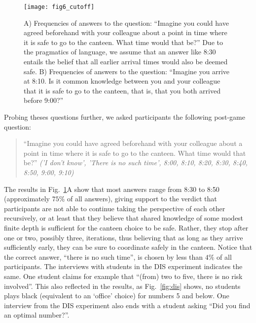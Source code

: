 \begin{figure} %
\centering\texttt{[image: fig6\_cutoff]}
\caption{A) Frequencies of answers to the question: ``Imagine you could have agreed beforehand with your colleague about a point in time where it is safe to go to the canteen. What time would that be?'' Due to the pragmatics of language, we assume that an answer like 8:30 entails the belief that all earlier arrival times would also be deemed safe. B) Frequencies of answers to the question: ``Imagine you arrive at 8:10. Is it common knowledge between you and your colleague that it is safe to go to the canteen, that is, that you both arrived before 9:00?''}
\label{fig:cutoff answers} %
\end{figure}
Probing theses questions further, we asked participants the following post-game question:
\begin{quote}
\indent
``Imagine you could have agreed beforehand with your colleague about a point in time where it is safe to go to the canteen. What time would that be?'' \textit{('I don't know', 'There is no such time', 8:00, 8:10, 8:20, 8:30, 8:40, 8:50, 9:00, 9:10)}
\end{quote}
The results in Fig.~\ref{fig:cutoff answers}A show that most answers range from 8:30 to 8:50 (approximately $75\%$ of all answers), giving support to the verdict that participants are not able to continue taking the perspective of each other recursively, or at least that they believe that shared knowledge of some modest finite depth is sufficient for the canteen choice to be safe. Rather, they stop after one or two, possibly three, iterations, thus believing that as long as they arrive sufficiently early, they can be sure to coordinate safely in the canteen. Notice that the correct answer, ``there is no such time'', is chosen by less than $4\%$ of all participants. The interviews with students in the DIS experiment indicates the same. One student claims for example that ``(from) two to five, there is no risk involved''. This also reflected in the results, as Fig.~\ref{fig:dis} shows, no students plays black (equivalent to an `office' choice) for numbers 5 and below. One interview from the DIS experiment also ends with a student asking ``Did you find an optimal number?''. 

